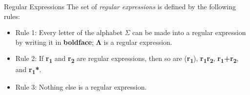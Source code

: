 \documentclass{article}
\begin{document}
\begin{multicols*}{3}
\begin{blackbox}{Regular Expressions}
    The set of \emph{regular expressions} is defined by the following rules: 
    \begin{itemize}[leftmargin=0.5cm]
        \item Rule 1: Every letter of the alphabet $\Sigma$ can be made into a regular expression by writing it in \textbf{boldface}; $\boldsymbol{\Lambda}$ is a regular expression.
        \item Rule 2: If \textbf{r\textsubscript{1}} and \textbf{r\textsubscript{2}} are regular expressions, then so are (\textbf{r\textsubscript{1}}), \textbf{r\textsubscript{1}r\textsubscript{2}}, \textbf{r\textsubscript{1}+r\textsubscript{2}}, and \textbf{r\textsubscript{1}*}.
        \item Rule 3: Nothing else is a regular expression.
    \end{itemize}
\end{blackbox}


\end{multicols*}
\end{document}
